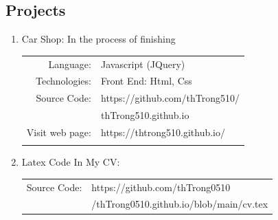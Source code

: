 \documentclass[11pt,oneside,a4paper,titlepage]{article}
\begin{document}
\begin{tcolorbox}
\begin{minipage}[t]{11cm}
\begin{tcolorbox}[grow to right by=0.75cm,colframe=white,colback=white]
        \section*{Projects}
        \begin{enumerate}
            \item {Car Shop: In the process of finishing}
            \begin{center}
            \begin{tabular}{r l}
            Language:& Javascript (JQuery) \\
            Technologies:& Front End:  Html, Css \\ 
            Source Code:& https://github.com/thTrong510/ \\
                        & thTrong510.github.io \\
            Visit web page:& https://thtrong510.github.io/ \\ \\ 
            \end{tabular}
            \end{center}
            \item {Latex Code In My CV: }
            \begin{center}
            \begin{tabular}{r l}
            Source Code:&  https://github.com/thTrong0510\\
                     &/thTrong0510.github.io/blob/main/cv.tex
            \end{tabular}
            \end{center}
        \end{enumerate}
        
        \end{tcolorbox}
    \end{minipage}
\end{tcolorbox}
\end{document}

